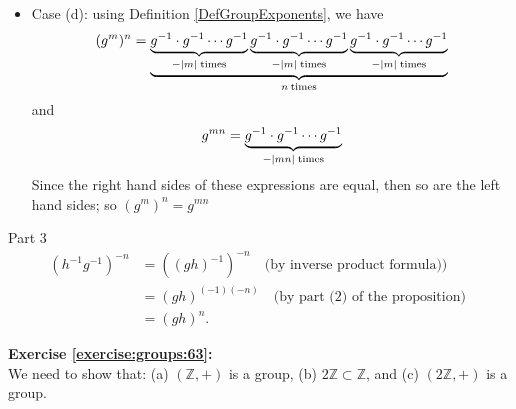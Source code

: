 \begin{itemize}
\item
Case (d): using Definition \ref{DefGroupExponents}, we have\\
\[
(g^m)^n = \underbrace{ \underbrace{g^{-1} \cdot g^{-1} \cdots g^{-1}}_{-|m| \; {\rm times}}\underbrace{g^{-1} \cdot g^{-1} \cdots g^{-1}}_{-|m| \; {\rm times}}\underbrace{g^{-1} \cdot g^{-1} \cdots g^{-1}}_{-|m| \; {\rm times}}}_{n \: {\rm times}}
\]
and
\[
g^{m  n} = {\underbrace{g^{-1} \cdot g^{-1}  \cdots g^{-1}}_{-|mn| \; {\rm times}}}
\]
Since the right hand sides of these expressions are equal, then so are the left hand sides; so $(g^m)^n = g^{m  n}$\\
\end{itemize}


Part 3\\
\begin{align*}
(h^{-1}g^{-1})^{-n}&= ((gh)^{-1})^{-n} \quad \text{(by inverse product formula))}\\
&=(gh)^{(-1)(-n)} \quad \text{(by part (2) of the proposition) }\\
&=(gh)^n.
\end{align*}

\noindent\textbf{Exercise \ref{exercise:groups:63}:}\\
We need to show that: (a) $({\mathbb Z}, +)$ is a group, (b) $2{\mathbb Z} \subset {\mathbb Z}$, and (c) $(2{\mathbb Z}, +)$ is a group.

